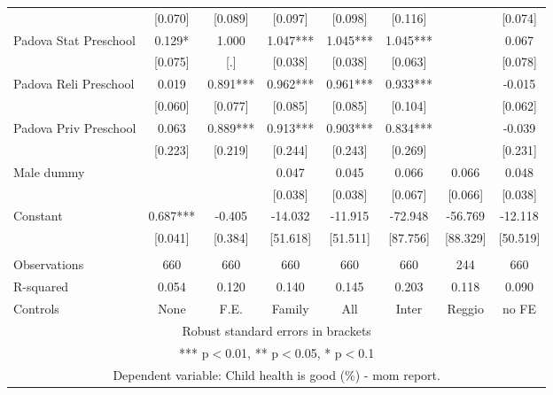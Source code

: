 \begin{tabular}{lccccccc}
 & [0.070] & [0.089] & [0.097] & [0.098] & [0.116] &  & [0.074] \\
Padova Stat Preschool & 0.129* & 1.000 & 1.047*** & 1.045*** & 1.045*** &  & 0.067 \\
 & [0.075] & [.] & [0.038] & [0.038] & [0.063] &  & [0.078] \\
Padova Reli Preschool & 0.019 & 0.891*** & 0.962*** & 0.961*** & 0.933*** &  & -0.015 \\
 & [0.060] & [0.077] & [0.085] & [0.085] & [0.104] &  & [0.062] \\
Padova Priv Preschool & 0.063 & 0.889*** & 0.913*** & 0.903*** & 0.834*** &  & -0.039 \\
 & [0.223] & [0.219] & [0.244] & [0.243] & [0.269] &  & [0.231] \\
Male dummy &  &  & 0.047 & 0.045 & 0.066 & 0.066 & 0.048 \\
 &  &  & [0.038] & [0.038] & [0.067] & [0.066] & [0.038] \\
Constant & 0.687*** & -0.405 & -14.032 & -11.915 & -72.948 & -56.769 & -12.118 \\
 & [0.041] & [0.384] & [51.618] & [51.511] & [87.756] & [88.329] & [50.519] \\
 &  &  &  &  &  &  &  \\
Observations & 660 & 660 & 660 & 660 & 660 & 244 & 660 \\
R-squared & 0.054 & 0.120 & 0.140 & 0.145 & 0.203 & 0.118 & 0.090 \\
 Controls & None & F.E. & Family & All & Inter & Reggio & no FE \\ \hline
\multicolumn{8}{c}{ Robust standard errors in brackets} \\
\multicolumn{8}{c}{ *** p$<$0.01, ** p$<$0.05, * p$<$0.1} \\
\multicolumn{8}{c}{ Dependent variable: Child health is good (\%) - mom report.} \\
\end{tabular}

